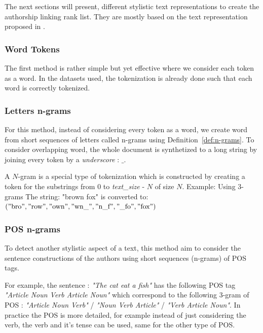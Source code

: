 The next sections will present, different stylistic text representations to create the authorship linking rank list. They are mostly based on the text representation proposed in \cite{kocher_verification}.

\subsubsection{Word Tokens}

The first method is rather simple but yet effective where we consider each token as a word.
In the datasets used, the tokenization is already done such that each word is correctly tokenized.

\subsubsection{Letters n-grams}

For this method, instead of considering every token as a word, we create word from short sequences of letters called n-grams using Definition~\ref{def:n-grams}.
To consider overlapping word, the whole document is synthetized to a long string by joining every token by a \textit{underscore} : $\_$.

\begin{definition}[$N$-Grams]
  \label{def:n-grams}
  A $N$-gram is a special type of tokenization which is constructed by creating a token for the substrings from $0$ to \textit{text\_size} - $N$ of size $N$.
  Example: Using 3-grams The string: "brown fox" is converted to: \\
  $("\text{bro}", "\text{row}", "\text{own}", "\text{wn\_}", "\text{n\_f}", "\text{\_fo}", "\text{fox}")$
\end{definition}


\subsubsection{POS n-grams}

To detect another stylistic aspect of a text, this method aim to consider the sentence constructions of the authors using short sequences (n-grams) of POS tags.

For example, the sentence : \textit{"The cat eat a fish"} has the following POS tag \textit{"Article Noun Verb Article Noun"} which correspond to the following 3-gram of POS : \textit{"Article Noun Verb"} / \textit{"Noun Verb Article"} / \textit{"Verb Article Noun"}.
In practice the POS is more detailed, for example instead of just considering the verb, the verb and it's tense can be used, same for the other type of POS.

